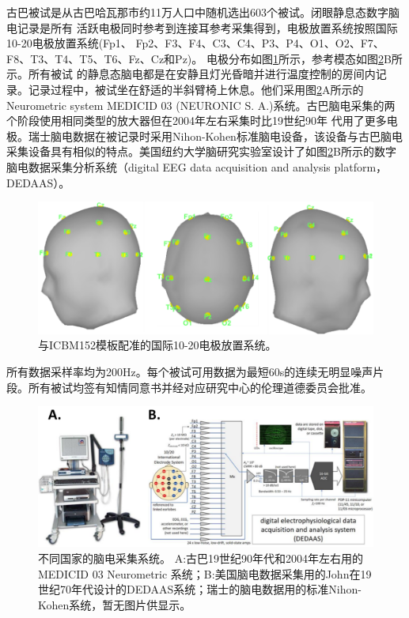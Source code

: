 古巴被试是从古巴哈瓦那市约11万人口中随机选出603个被试。闭眼静息态数字脑电记录是所有
活跃电极同时参考到连接耳参考采集得到，电极放置系统按照国际10-20电极放置系统(Fp1、
Fp2、F3、F4、C3、C4、P3、P4、O1、O2、F7、F8、T3、T4、T5、T6、Fz、Cz和Pz)。 电极分布如图\ref{ele}所示，参考模态如图\ref{amp}B所示。所有被试
的静息态脑电都是在安静且灯光昏暗并进行温度控制的房间内记录。记录过程中，被试坐在舒适的半斜臂椅上休息。他们采用图\ref{amp}A所示的
Neurometric system MEDICID 03 (NEURONIC S. A.)系统。古巴脑电采集的两个阶段使用相同类型的放大器但在2004年左右采集时比19世纪90年
代用了更多电极。瑞士脑电数据在被记录时采用Nihon-Kohen标准脑电设备，该设备与古巴脑电采集设备具有相似的特点。美国纽约大学脑研究实验室设计了如图\ref{amp}B所示的数字脑电数据采集分析系统（digital EEG data acquisition and analysis platform，DEDAAS）。
\begin{figure}[!h]
\includegraphics[width=13cm]{pic/Norm/figure2.png}
\caption{与ICBM152模板配准的国际10-20电极放置系统。}
\label{ele}
\end{figure}
所有数据采样率均为200Hz。每个被试可用数据为最短60s的连续无明显噪声片段。所有被试均签有知情同意书并经对应研究中心的伦理道德委员会批准。
\begin{figure}[!h]
\includegraphics[width=15cm]{pic/Norm/figure3.png}
\caption{不同国家的脑电采集系统。 A:古巴19世纪90年代和2004年左右用的MEDICID 03 Neurometric 系统；B:美国脑电数据采集用的John在19
世纪70年代设计的DEDAAS系统；瑞士的脑电数据用的标准Nihon-Kohen系统，暂无图片供显示。}
\label{amp}
\end{figure}


